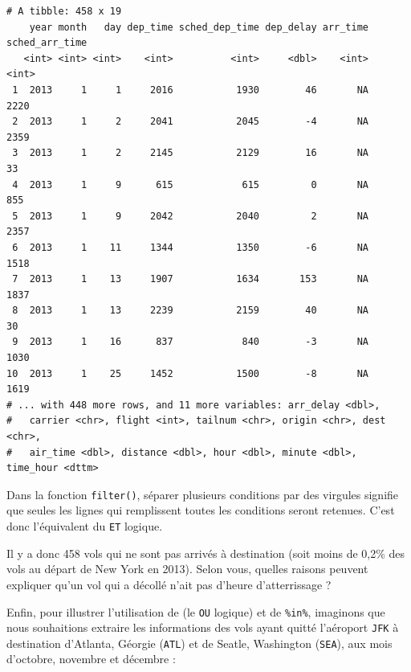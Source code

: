 \documentclass[a4paperpaper,]{article}
\newenvironment{Shaded}{\begin{snugshade}}{\end{snugshade}}
\newcommand{\KeywordTok}[1]{\textcolor[rgb]{0.13,0.29,0.53}{\textbf{#1}}}
\newcommand{\DecValTok}[1]{\textcolor[rgb]{0.00,0.00,0.81}{#1}}
\newcommand{\StringTok}[1]{\textcolor[rgb]{0.31,0.60,0.02}{#1}}
\newcommand{\OperatorTok}[1]{\textcolor[rgb]{0.81,0.36,0.00}{\textbf{#1}}}
\newcommand{\NormalTok}[1]{#1}
\theoremstyle{definition}
\theoremstyle{definition}
\theoremstyle{definition}
\theoremstyle{remark}
\begin{document}
\begin{verbatim}
# A tibble: 458 x 19
    year month   day dep_time sched_dep_time dep_delay arr_time sched_arr_time
   <int> <int> <int>    <int>          <int>     <dbl>    <int>          <int>
 1  2013     1     1     2016           1930        46       NA           2220
 2  2013     1     2     2041           2045        -4       NA           2359
 3  2013     1     2     2145           2129        16       NA             33
 4  2013     1     9      615            615         0       NA            855
 5  2013     1     9     2042           2040         2       NA           2357
 6  2013     1    11     1344           1350        -6       NA           1518
 7  2013     1    13     1907           1634       153       NA           1837
 8  2013     1    13     2239           2159        40       NA             30
 9  2013     1    16      837            840        -3       NA           1030
10  2013     1    25     1452           1500        -8       NA           1619
# ... with 448 more rows, and 11 more variables: arr_delay <dbl>,
#   carrier <chr>, flight <int>, tailnum <chr>, origin <chr>, dest <chr>,
#   air_time <dbl>, distance <dbl>, hour <dbl>, minute <dbl>, time_hour <dttm>
\end{verbatim}

Dans la fonction \texttt{filter()}, séparer plusieurs conditions par des
virgules signifie que seules les lignes qui remplissent toutes les
conditions seront retenues. C'est donc l'équivalent du \texttt{ET}
logique.

Il y a donc 458 vols qui ne sont pas arrivés à destination (soit moins
de 0,2\% des vols au départ de New York en 2013). Selon vous, quelles
raisons peuvent expliquer qu'un vol qui a décollé n'ait pas d'heure
d'atterrissage ?

Enfin, pour illustrer l'utilisation de \texttt{\textbar{}} (le
\texttt{OU} logique) et de \texttt{\%in\%}, imaginons que nous
souhaitions extraire les informations des vols ayant quitté l'aéroport
\texttt{JFK} à destination d'Atlanta, Géorgie (\texttt{ATL}) et de
Seatle, Washington (\texttt{SEA}), aux mois d'octobre, novembre et
décembre :

\begin{Shaded}
\end{Shaded}
\end{document}
